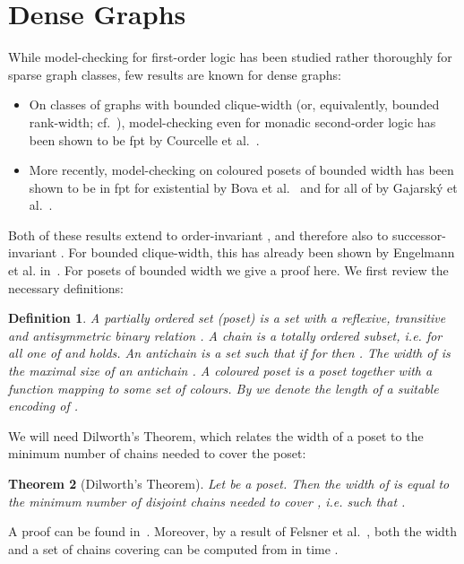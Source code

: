 \documentclass[12pt]{amsart}
\newtheorem{theorem}{Theorem}[section]
\newtheorem{definition}[theorem]{Definition}
\begin{document}
\section{Dense Graphs}
\label{sec:dense}

While model-checking for first-order logic has been studied rather
thoroughly for sparse graph classes, few results are known for dense
graphs:
\begin{itemize}
\item On classes of graphs with bounded clique-width (or,
  equivalently, bounded rank-width; cf.~\cite{OumSey06}),
  model-checking even for monadic second-order logic has been shown to
  be fpt by Courcelle et al.~\cite{CourcelleMakRot00}.
\item More recently, model-checking on coloured posets of bounded
  width has been shown to be in fpt for existential  by Bova et
  al.~\cite{bova2015model} and for all of  by Gajarský et
  al.~\cite{gajarsky2015fo}.
\end{itemize}

Both of these results extend to order-invariant , and therefore
also to successor-invariant . For bounded clique-width, this has
already been shown by Engelmann et
al. in~\cite[Thm.~4.2]{EngelmannKS12}. For posets of bounded width we
give a proof here. We first review the necessary definitions:
\begin{definition}
  A \emph{partially ordered set (poset)}  is a set 
  with a reflexive, transitive and antisymmetric binary relation
  . A \emph{chain}  is a totally ordered
  subset, i.e. for all  one of  and  holds. An \emph{antichain} is a set  such that if
   for  then . The \emph{width} of
   is the maximal size  of an antichain . A \emph{coloured} poset is a poset  together with a
  function  mapping  to some set 
  of \emph{colours}. By  we denote the length of a
  suitable encoding of .
\end{definition}
We will need Dilworth's Theorem, which relates the width of a poset to
the minimum number of chains needed to cover the poset:
\begin{theorem}[Dilworth's Theorem]
  Let  be a poset. Then the width of  is equal
  to the minimum number  of disjoint chains  needed to cover , i.e. such that .
\end{theorem}
A proof can be found in~\cite[Sec.~2.5]{diestel}. Moreover, by a
result of Felsner et al.~\cite{felsner2003recognition}, both the width
 and a set of chains  covering  can be computed
from  in time .
\end{document}
